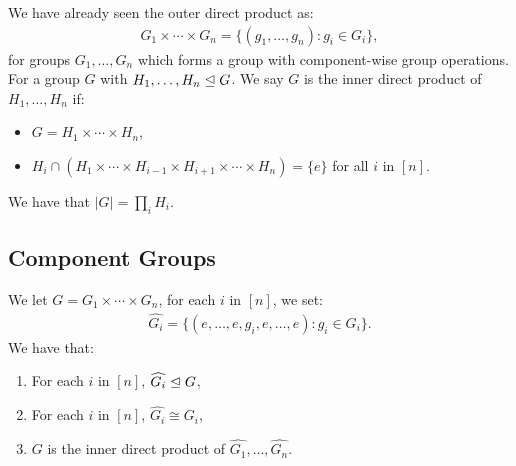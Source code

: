 We have already seen the outer direct product as: \begin{align*}
    G_1 \times \cdots \times G_n = \{(g_1, \ldots, g_n) : g_i \in G_i\},
\end{align*} for groups $G_1, \ldots, G_n$ which forms a group with
component-wise group operations.
\\[\baselineskip]
For a group $G$ with $H_1, \ldots, H_n \trianglelefteq G$. We say $G$ is the
inner direct product of $H_1, \ldots, H_n$ if: \begin{itemize}
    \item $G = H_1 \times \cdots \times H_n$,
    \item $H_i \cap (H_1 \times \cdots \times H_{i - 1} 
        \times H_{i + 1} \times \cdots \times H_n) = \{e\}$ 
        for all $i$ in $[n]$.  
\end{itemize} We have that $|G| = \prod_i H_i$.

\subsection{Component Groups}

We let $G = G_1 \times \cdots \times G_n$, for each $i$ in $[n]$, we
set: \begin{align*}
    \widehat{G_i} = \{(e, \ldots, e, g_i, e, \ldots, e) : g_i \in G_i\}.
\end{align*} We have that: \begin{enumerate}
    \item For each $i$ in $[n]$, $\widehat{G_i} \trianglelefteq G$,
    \item For each $i$ in $[n]$, $\widehat{G_i} \cong G_i$,
    \item $G$ is the inner direct product of 
        $\widehat{G_1}, \ldots, \widehat{G_n}$.
\end{enumerate}

